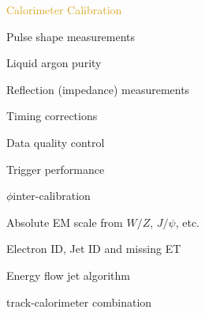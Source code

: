 \begin{frame}{\textcolor{Goldenrod}{Calorimeter Calibration}}
  \begin{overlayarea}{\textwidth}{\textheight}
    \itt
  \item {}
    \itt
    \item Pulse shape measurements\\
    \item Liquid argon purity\\
    \item Reflection (impedance) measurements\\
    \item Timing corrections\\
      \tti
    \item {}
      \itt
    \item Data quality control\\
    \item Trigger performance\\
    \item $\phi$inter-calibration\\
    \item Absolute EM scale from $W/Z$, $J/\psi$, etc.\\
    \item Electron ID, Jet ID and missing ET\\
    \item Energy flow jet algorithm\\
    \item track-calorimeter combination\\
      \tti
      \tti
  \end{overlayarea}
\end{frame}  

